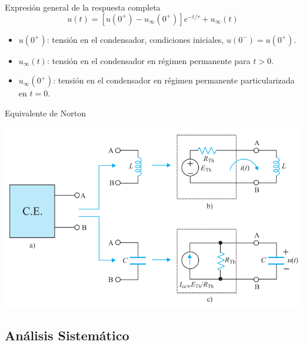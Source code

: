 \documentclass[aspectratio=169, usenames,svgnames,dvipsnames]{beamer}
\begin{document}
\begin{frame}[label={sec:orgc295eb8}]{Expresión general de la respuesta completa}
\[
\boxed{u(t) = \left[u(0^+) - u_\infty(0^+)\right] e^{-t/\tau} + u_\infty(t)}
\]

\begin{itemize}
\item \(u(0^+)\): tensión en el condensador, condiciones iniciales, \(u(0^-) = u(0^+)\).
\item \(u_\infty(t)\): tensión en el condensador en régimen permanente para \(t > 0\).
\item \(u_\infty(0^+)\): tensión en el condensador en régimen permanente particularizada en \(t = 0\).
\end{itemize}
\end{frame}
\begin{frame}[label={sec:org1bada6b}]{Equivalente de Norton}
\begin{center}
\includegraphics[height=0.85\textheight]{../figs/Thevenin_PrimerOrden.pdf}
\end{center}
\end{frame}
\subsection{Análisis Sistemático}
\label{sec:org2547de8}
\end{document}
